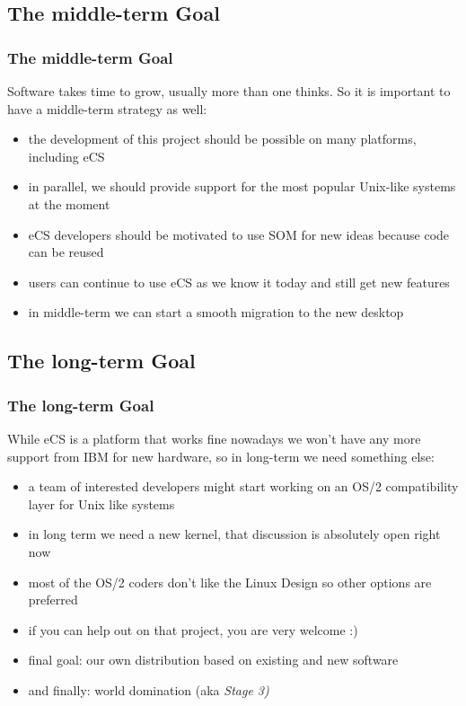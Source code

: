 \documentclass[handout]{beamer}
\begin{document}
\subsection{The middle-term Goal}
\begin{frame}
\frametitle{The middle-term Goal}
	Software takes time to grow, usually more than one thinks. So it is important to have a middle-term strategy as well:
	\begin{itemize}
      \item the development of this project should be possible on many platforms, including eCS
      \item in parallel, we should provide support for the most popular Unix-like systems at the moment
      \item eCS developers should be motivated to use SOM for new ideas because code can be reused
      \item users can continue to use eCS as we know it today and still get new features
      \item in middle-term we can start a smooth migration to the new desktop
    \end{itemize}      
\end{frame}


\subsection{The long-term Goal}
\begin{frame}
\frametitle{The long-term Goal}
	While eCS is a platform that works fine nowadays we won't have any more support from IBM for new hardware, so in long-term we need something else:
	\begin{itemize}
      \item a team of interested developers might start working on an OS/2 compatibility layer for Unix like systems
      \item in long term we need a new kernel, that discussion is absolutely open right now
      \item most of the OS/2 coders don't like the Linux Design so other options are preferred
      \item if you can help out on that project, you are very welcome :)
      \item final goal: our own distribution based on existing and new software
      \item and finally: world domination (aka \it{Stage 3})
    \end{itemize}
\end{frame}
\end{document}

